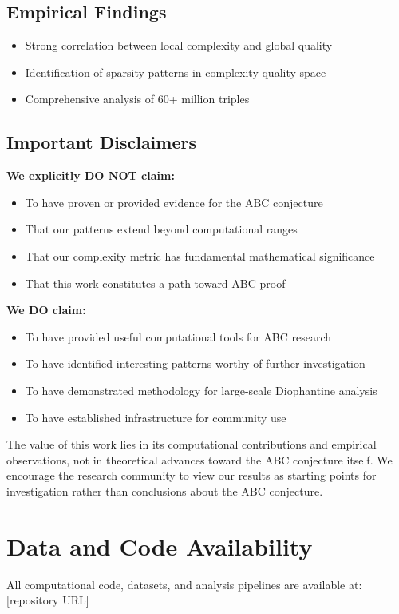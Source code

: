 \documentclass[11pt,a4paper]{article}
\begin{document}
\subsection{Empirical Findings}
\begin{itemize}
    \item Strong correlation between local complexity and global quality
    \item Identification of sparsity patterns in complexity-quality space
    \item Comprehensive analysis of 60+ million triples
\end{itemize}

\subsection{Important Disclaimers}

\textbf{We explicitly DO NOT claim:}
\begin{itemize}
    \item To have proven or provided evidence for the ABC conjecture
    \item That our patterns extend beyond computational ranges
    \item That our complexity metric has fundamental mathematical significance
    \item That this work constitutes a path toward ABC proof
\end{itemize}

\textbf{We DO claim:}
\begin{itemize}
    \item To have provided useful computational tools for ABC research
    \item To have identified interesting patterns worthy of further investigation
    \item To have demonstrated methodology for large-scale Diophantine analysis
    \item To have established infrastructure for community use
\end{itemize}

The value of this work lies in its computational contributions and empirical observations, not in theoretical advances toward the ABC conjecture itself. We encourage the research community to view our results as starting points for investigation rather than conclusions about the ABC conjecture.

\section*{Data and Code Availability}
All computational code, datasets, and analysis pipelines are available at: [repository URL]
\end{document}
